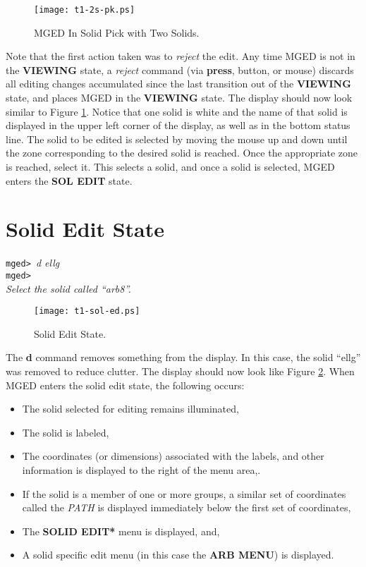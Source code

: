 \begin{figure}
\centering \texttt{[image: t1-2s-pk.ps]}
\caption{MGED In Solid Pick with Two Solids.}
\label{t1-2s-pk}
\end{figure}

Note that the first action taken was to {\sl reject} the edit.  Any time MGED
is not in the {\bf VIEWING} state, a {\sl reject} command (via
{\bf press}, button, or mouse) discards all editing changes accumulated
since the last transition out of the {\bf VIEWING} state, and places
MGED in the {\bf VIEWING} state.
The display should now look similar to Figure \ref{t1-2s-pk}.
Notice that one solid is white and
the name of that solid is displayed in the upper left corner of the
display, as well as in the bottom status line. The solid to be edited is
selected by moving the mouse up and down until the zone corresponding to
the desired solid is reached. Once the appropriate zone is reached, select it.
This selects a solid, and once a solid is selected,
MGED enters the {\bf SOL EDIT} state.

\section{Solid Edit State}

\noindent
{\tt mged> }{\em d ellg}\\
{\tt mged> }\\
{\em Select the solid called ``arb8''.}\\

\begin{figure}
\centering \texttt{[image: t1-sol-ed.ps]}
\caption{Solid Edit State.}
\label{t1-sol-ed}
\end{figure}

The {\bf d} command removes something from the display.  In this
case, the solid ``ellg'' was removed to reduce clutter.
The display should now look like Figure \ref{t1-sol-ed}.
When MGED enters the solid edit state, the following occurs:
\begin{itemize}
\item The solid selected for editing remains illuminated,
\item The solid is labeled,
\item The coordinates (or dimensions) associated with the labels,
and other information is displayed to the right of the menu area,.
\item If the solid is a member of one or more groups, a similar set
of coordinates called the {\sl PATH} is displayed immediately below
the first set of coordinates,
\item The {\bf *SOLID EDIT*} menu is displayed, and,
\item A solid specific edit menu (in this case the {\bf ARB MENU})
is displayed.
\end{itemize}

